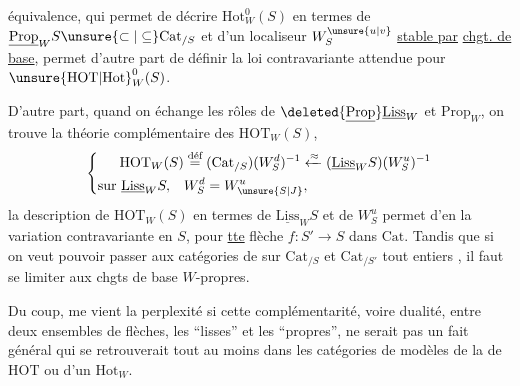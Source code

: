 équivalence, qui permet de décrire $\mathrm{Hot}_W^0(S)$ en termes de $\underline{\mathrm{Prop}}_W S\unsure{\subset|\subseteq}\mathrm{Cat}_{/S}$ et d'un localiseur $W_S^{\unsure{u|v}}$ \uline{stable par}  \uline{chgt. de base}, permet d'autre part de définir la loi contravariante attendue pour $\unsure{\mathrm{HOT}|\mathrm{Hot}}_W^0(S)$.

D'autre part, quand on échange les rôles de $\deleted{\underline{\mathrm{Prop}}}\underline{\mathrm{Liss}}_W$ et $\mathrm{Prop}_W$, on trouve la théorie complémentaire des $\mathrm{HOT}_W(S)$,
\[
\left\{\begin{aligned}
\mathrm{HOT}_W(S)&\overset{\text{déf}}{=}(\mathrm{Cat}_{/S})(W_S^d)^{-1}
\xleftarrow{\approx}(\underline{\mathrm{Liss}}_W S)(W_S^u)^{-1}\\
\text{sur }\underline{\mathrm{Liss}}_W S,\quad &W_S^d=W_{\unsure{S|J}}^u,
\end{aligned}\right.
\]
la description de $\mathrm{HOT}_W(S)$ en termes de $\underline{\mathrm{Liss}}_W S$ et de $W_S^u$ permet d'en   la variation contravariante en $S$, pour \uline{tte} flèche $f:S'\longrightarrow S$ dans $\mathrm{Cat}$. Tandis que si on veut pouvoir passer aux catégories de  sur $\mathrm{Cat}_{/S}$ et $\mathrm{Cat}_{/S'}$ tout entiers , il faut se limiter aux chgts de base $W$-propres.

Du coup, me vient la perplexité si cette complémentarité, voire  dualité, entre deux ensembles de flèches, les ``lisses'' et les ``propres'', ne serait pas un fait général qui se retrouverait tout au moins dans les catégories de modèles  de la  de $\mathrm{HOT}$ ou d'un $\mathrm{Hot}_W$.
